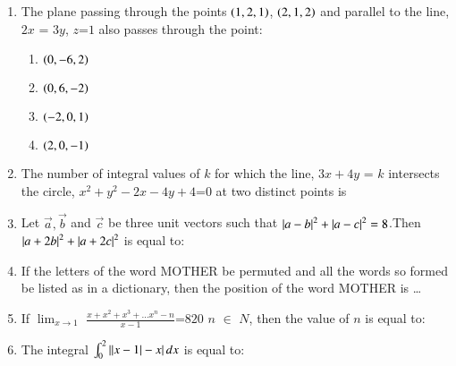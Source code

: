\documentclass[journal]{IEEEtran}
\begin{document}
\begin{enumerate} [start=16]
\begin{enumerate}
        \item $\brak{2,1}$
        \item $\brak{1,-1}$
    \end{enumerate}
    \item The plane passing through the points $\left(1,2,1\right)$, $\left(2,1,2\right)$ and parallel to the line, $2x$ = $3y$, $z$=$1$ also passes through the point:
    \begin{enumerate}
        \item $\left(0,-6,2\right)$
        \item $\left(0,6,-2\right)$
        \item $\left(-2,0,1\right)$
        \item $\left(2,0,-1\right)$
    \end{enumerate}
    \item  The number of integral values of $k$ for which the line, $3x+4y$ = $k$ intersects the circle, $x^2+y^2-2x-4y+4$=$0$ at two distinct points is
    \item Let $\Vec{a},\Vec{b}$ and $\Vec{c}$ be three unit vectors such that $\left\vert a-b\right\vert^2+\left\vert a-c\right\vert^2=8$.Then $\left\vert a+2b\right\vert^2+\left\vert a+2c\right\vert^2$ is equal to:
    \item If the letters of the word MOTHER be permuted and all the words so formed  be listed as in a dictionary, then the position of the word MOTHER is \dots 
    \item  If $\lim_{x \to 1}$ $\frac{x+x^2+x^3+\dots x^n-n}{x-1}$=$820$ $n$ $\in$ $N$, then the value of $n$ is equal to: \\
    \item The integral $\int_{0}^{2} \left\vert\left\vert x-1\right\vert-x\right\vert dx$ is equal to:
    
\end{enumerate}
\end{document}
